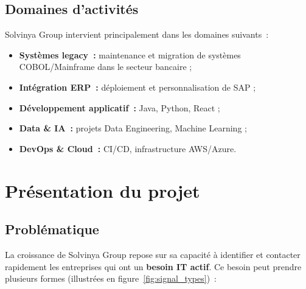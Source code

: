 \subsection{Domaines d'activités}

Solvinya Group intervient principalement dans les domaines suivants~:

\begin{itemize}
  \item \textbf{Systèmes legacy~:} maintenance et migration de systèmes
        COBOL/Mainframe dans le secteur bancaire ;
  \item \textbf{Intégration ERP~:} déploiement et personnalisation de SAP ;
  \item \textbf{Développement applicatif~:} Java, Python, React ;
  \item \textbf{Data \& IA~:} projets Data Engineering, Machine Learning ;
  \item \textbf{DevOps \& Cloud~:} CI/CD, infrastructure AWS/Azure.
\end{itemize}

\section{Présentation du projet}

\subsection{Problématique}

La croissance de Solvinya Group repose sur sa capacité à identifier et contacter
rapidement les entreprises qui ont un \textbf{besoin IT actif}. Ce besoin peut
prendre plusieurs formes (illustrées en figure~\vref{fig:signal_types})~:

